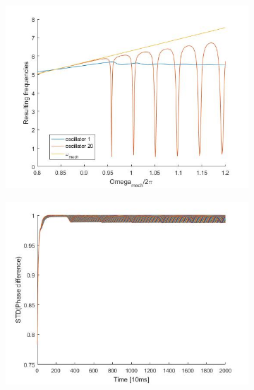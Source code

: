 \documentclass[a4paper]{scrartcl}
\begin{document}
\begin{figure}[t]
	\centering
	\begin{subfigure}[b]{0.49\textwidth}
		\centering
		\includegraphics[width=\textwidth]{results/6.c/Freq_A_const.jpg}
		\caption{}\label{4a}
	\end{subfigure}
	\centering
	\begin{subfigure}[b]{0.49\textwidth}
		\centering
		\includegraphics[width=\textwidth]{results/6.c/Phase_A_const.jpg}
		\caption{}\label{4b}
	\end{subfigure}
	\centering
	\begin{subfigure}[b]{0.49\textwidth}
		\centering

\end{subfigure}
\end{figure}
\end{document}
